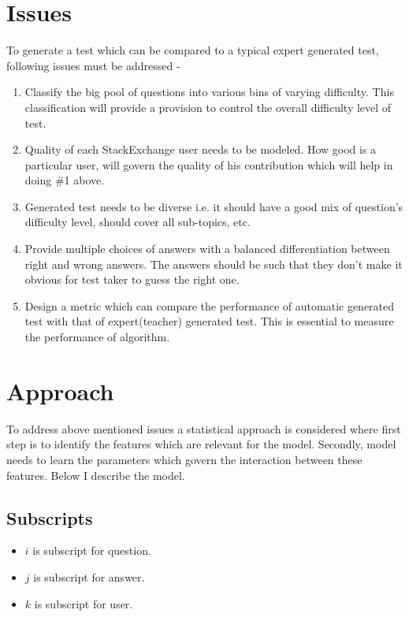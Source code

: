 \documentclass{article}
\begin{document}
\section{Issues}
To generate a test which can be compared to a typical expert generated test,
following issues must be addressed -
\begin{enumerate}
    \item Classify the big pool of questions into various bins of varying difficulty.
        This classification will provide a provision to control the
        overall difficulty level of test.
    \item Quality of each StackExchange user needs to be modeled. How good is a particular user, will
        govern the quality of his contribution which will help in doing \#1 above.
    \item Generated test needs to be diverse i.e. it should have a good mix of
        question's difficulty level, should cover all sub-topics, etc.
    \item Provide multiple choices of answers with a balanced differentiation
        between right and wrong answers. The answers should be such that they
        don't make it obvious for test taker to guess the right one.
    \item Design a metric which can compare the performance of automatic generated
        test with that of expert(teacher) generated test. This is essential to 
        measure the performance of algorithm.
\end{enumerate}
\section{Approach}
To address above mentioned issues a statistical approach is considered 
where first step is to identify the features which are relevant for the model.
Secondly, model needs to learn the parameters which govern the interaction
between these features.
Below I describe the model.
\subsection{Subscripts}
\begin{itemize}
    \item $i$ is subscript for question.
    \item $j$ is subscript for answer.
    \item $k$ is subscript for user.
\end{itemize}
\end{document}
